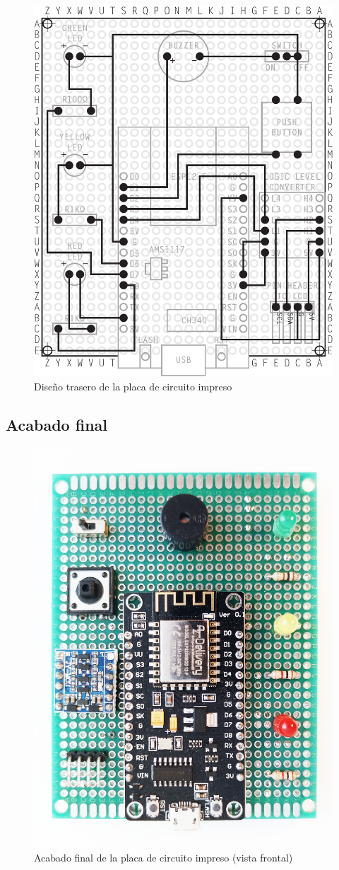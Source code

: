 \vfill

\clearpage

\begin{figure}
  \centering
  \includegraphics[width=0.7\columnwidth]{../design/interior-board-back}
  \caption{Diseño trasero de la placa de circuito impreso}
  \label{fig:interior-board-back}
\end{figure}

\clearpage

\subsection{Acabado final}

\vfill

\begin{figure}[H]
  \centering
  \includegraphics[width=0.7\columnwidth]{../photos/interior-pcb-front}
  \caption{Acabado final de la placa de circuito impreso (vista frontal)}
  \label{fig:interior-pcb-front}
\end{figure}

